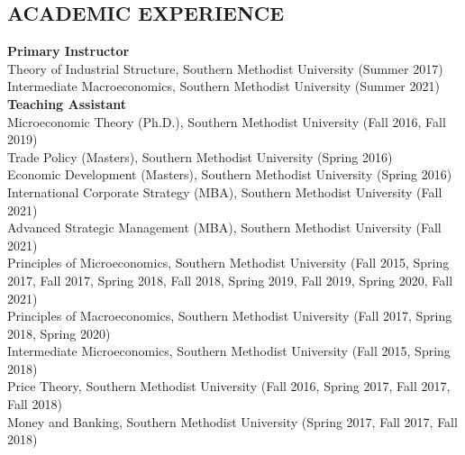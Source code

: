 \documentclass[11pt]{res}
\begin{document}
\begin{resume}
\section{ACADEMIC EXPERIENCE} \vspace{3mm}
{\bf Primary Instructor}\vspace{2mm}\\
Theory of Industrial Structure, Southern Methodist University (Summer 2017)\vspace{1.5mm}\\
Intermediate Macroeconomics, Southern Methodist University (Summer 2021)\vspace{1.5mm}\\
{\bf Teaching Assistant}\vspace{2mm}\\
Microeconomic Theory (Ph.D.), Southern Methodist University (Fall 2016, Fall 2019)\vspace{1.5mm}\\
Trade Policy (Masters), Southern Methodist University (Spring 2016)\vspace{1.5mm}\\
Economic Development (Masters), Southern Methodist University (Spring 2016)\vspace{1.5mm}\\
International Corporate Strategy (MBA), Southern Methodist University (Fall 2021)\vspace{1.5mm}\\
Advanced Strategic Management (MBA), Southern Methodist University (Fall 2021)\vspace{1.5mm}\\
Principles of Microeconomics, Southern Methodist University (Fall 2015, Spring 2017, Fall 2017, Spring 2018, Fall 2018, Spring 2019, Fall 2019, Spring 2020, Fall 2021)\vspace{1.5mm}\\
Principles of Macroeconomics, Southern Methodist University (Fall 2017, Spring 2018, Spring 2020)\vspace{1.5mm}\\
Intermediate Microeconomics, Southern Methodist University (Fall 2015, Spring 2018)\vspace{1.5mm}\\
Price Theory, Southern Methodist University (Fall 2016, Spring 2017, Fall 2017, Fall 2018)\vspace{1.5mm}\\
Money and Banking, Southern Methodist University (Spring 2017, Fall 2017, Fall 2018)\vspace{1.5mm}\\

\end{resume}
\end{document}
